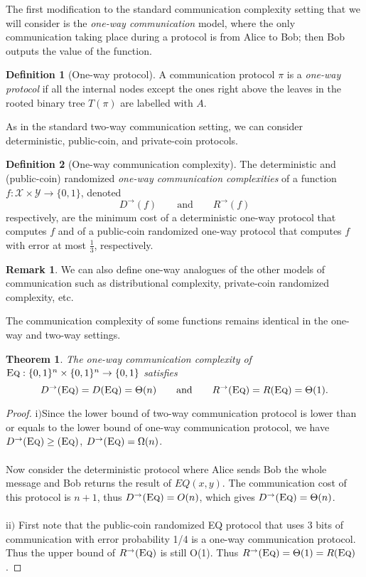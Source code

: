 \documentclass[11pt,oneside]{book}
\theoremstyle{plain}
\newtheorem{theorem}{Theorem}
\theoremstyle{definition}
\newtheorem{definition}{Definition}
\newtheorem{remark}{Remark}
\theoremstyle{plain}
\newcommand{\calX}{\mathcal{X}}
\newcommand{\calY}{\mathcal{Y}}
\newcommand{\Eq}{\textsc{Eq}}
\begin{document}
The first modification to the standard communication complexity setting that we will consider is the \emph{one-way communication} model, where the only communication taking place during a protocol is from Alice to Bob; then Bob outputs the value of the function.

\begin{definition}[One-way protocol]
	A communication protocol $\pi$ is a \emph{one-way protocol} if all the internal nodes except the ones right above the leaves in the rooted binary tree $T(\pi)$ are labelled with $A$.
\end{definition}

As in the standard two-way communication setting, we can consider deterministic, public-coin, and private-coin protocols.

\begin{definition}[One-way communication complexity]
	The deterministic and (public-coin) randomized \emph{one-way communication complexities} of a function $f : \calX \times \calY \to \{0,1\}$, denoted
	\[
	D^{\rightarrow}(f) \qquad \mbox{and} \qquad R^{\rightarrow}(f)
	\]
	respectively, are the minimum cost of a deterministic one-way protocol that computes $f$ and of a public-coin randomized one-way protocol that computes $f$ with error at most $\frac13$, respectively.
\end{definition}

\begin{remark}
	We can also define one-way analogues of the other models of communication such as distributional complexity, private-coin randomized complexity, etc.
\end{remark}

The communication complexity of some functions remains identical in the one-way and two-way settings.

\begin{theorem}
	The one-way communication complexity of $\Eq : \{0,1\}^n \times \{0,1\}^n \to \{0,1\}$ satisfies
	\[
	D^\rightarrow(\Eq) = D(\Eq) = \Theta(n) \qquad \mbox{and} \qquad 
	R^\rightarrow(\Eq) = R(\Eq) = \Theta(1).
	\]
\end{theorem}

\begin{proof}
	i$)$Since the lower bound of two-way communication protocol is lower than or equals to the lower bound of one-way communication protocol, we have $D^\rightarrow(\Eq) \ge (\Eq)$, $D^\rightarrow(\Eq) = \Omega(n)$.\\
	\\
	Now consider the deterministic protocol where Alice sends Bob the whole message and Bob returns the result of $EQ(x,y)$. The communication cost of this protocol is $n+1$, thus $D^\rightarrow(\Eq) = O(n)$, which gives $D^\rightarrow(\Eq) = \Theta(n)$.\\
	\\
	ii$)$ First note that the public-coin randomized EQ protocol that uses 3 bits of communication with error probability 1/4 is a one-way communication protocol. Thus the upper bound of $R^\rightarrow(\Eq)$ is still O(1). Thus $R^\rightarrow(\Eq)= \Theta(1) = R(\Eq) $.
\end{proof}
\end{document}

